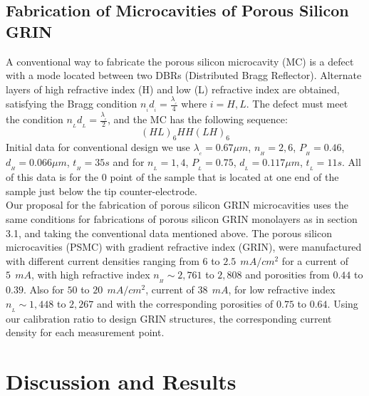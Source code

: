 \documentclass{article}
\begin{document}
 \subsection{Fabrication  of Microcavities of Porous Silicon GRIN }
 A conventional way to fabricate the porous silicon microcavity (MC)
 is a defect with a mode located between two DBRs (Distributed Bragg
 Reflector). Alternate layers of high refractive index (H) and low (L)
 refractive index are obtained, satisfying the Bragg condition
 $n_{_{i}}d_{_{i}}=\frac{\lambda_{_{c}}}{4}$  where $ i = H, L $. The
 defect must meet the condition
 $n_{_{L}}d_{_{L}}=\frac{\lambda_{_{c}}}{2}$, and the MC has the
 following sequence: $$ (HL)_6 HH (LH )_6 $$
 Initial data for conventional design we use $\lambda_{_{c}}= 0.67 \mu
 m$, $n_{_{H}} =2,6$, $P_{_{H}} =0.46$, $d_{_{H}}=0.066 \mu m  $,
 $t_{_{H}}=35 s  $ and for $n_{_{L}}= 1,4$,  $P_{_{L}} =0.75$,
 $d_{_{L}}=0.117 \mu m  $, $t_{_{L}}=11 s  $. All of this data is for
 the $ 0 $ point of the sample that is located at one end of the
 sample just below the tip counter-electrode.\\
 Our proposal for the fabrication of porous silicon GRIN microcavities
 uses the same conditions for fabrications of porous silicon GRIN
 monolayers as in section 3.1, and taking the conventional data
 mentioned above. The porous silicon microcavities (PSMC) with
 gradient refractive index (GRIN), were manufactured with different
 current densities ranging from $ 6 $ to $ 2.5 \ \ mA / cm ^ 2 $ for a
 current of $ 5 \ \ mA $, with high refractive index $n_{_{H}} \sim
 2,761 $ to $ 2,808 $ and porosities from $ 0.44 $ to $ 0.39 $. Also
 for $ 50  $ to $ 20 \ \ mA / cm ^ 2 $, current of $ 38 \ \ mA $, for
 low refractive index $n_{_{L}}\sim 1,448 $ to $ 2,267 $ and with the
 corresponding  porosities of $ 0.75 $ to $ 0.64 $. Using our
 calibration ratio to design GRIN structures,  the corresponding
 current density for each measurement point.

\section{Discussion and Results}
\end{document}

